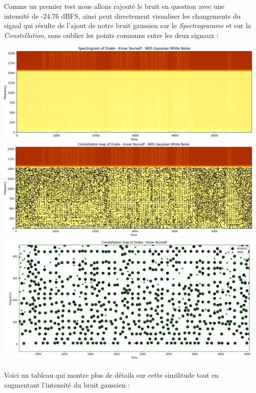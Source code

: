 \documentclass[11pt, report, french]{scrreprt}
\begin{document}
\vspace{0.5cm}
Comme un premier test nous allons rajouté le bruit en question avec une intensité de -24.76 dBFS, ainsi peut directement visualiser les changements du signal qui résulte de l'ajout de notre bruit gaussien sur le \textit{Spectrogramme} et sur la \textit{Constellation}, sans oublier les points communs entre les deux signaux :

\begin{center}
	\includegraphics[scale=0.535]{img/spec_drake_wn.png}\vspace{1cm}
	\includegraphics[scale=0.5]{img/peaks_drake_wn.png}\vspace{1cm}
	\includegraphics[scale=0.5]{img/similitude_drake_noise_zoom.png}
\end{center}

Voici un tableau qui montre plus de détails sur cette similitude tout en augmentant l'intensité du bruit gaussien :
\end{document}
